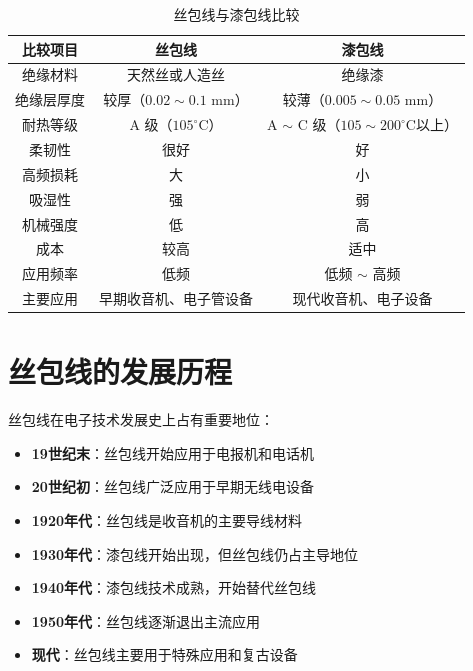 \documentclass[12pt,UTF8]{ctexbook}
\begin{document}
\begin{table}[H]
    \centering
    \begin{tabular}{|c|c|c|}
        \hline
        \textbf{比较项目} & \textbf{丝包线} & \textbf{漆包线} \\
        \hline
        绝缘材料 & 天然丝或人造丝 & 绝缘漆 \\
        \hline
        绝缘层厚度 & 较厚（$0.02 \sim 0.1$ mm） & 较薄（$0.005 \sim 0.05$ mm） \\
        \hline
        耐热等级 & A 级（$105^\circ$C） & A $\sim$ C 级（$105 \sim 200^\circ$C以上） \\
        \hline
        柔韧性 & 很好 & 好 \\
        \hline
        高频损耗 & 大 & 小 \\
        \hline
        吸湿性 & 强 & 弱 \\
        \hline
        机械强度 & 低 & 高 \\
        \hline
        成本 & 较高 & 适中 \\
        \hline
        应用频率 & 低频 & 低频 $\sim$ 高频 \\
        \hline
        主要应用 & 早期收音机、电子管设备 & 现代收音机、电子设备 \\
        \hline
    \end{tabular}
    \caption{丝包线与漆包线比较}
    \label{tab:silk_vs_enamel}
\end{table}

\section{丝包线的发展历程}

丝包线在电子技术发展史上占有重要地位：

\begin{itemize}[leftmargin=2cm]
    \item \textbf{19世纪末}：丝包线开始应用于电报机和电话机
    \item \textbf{20世纪初}：丝包线广泛应用于早期无线电设备
    \item \textbf{1920年代}：丝包线是收音机的主要导线材料
    \item \textbf{1930年代}：漆包线开始出现，但丝包线仍占主导地位
    \item \textbf{1940年代}：漆包线技术成熟，开始替代丝包线
    \item \textbf{1950年代}：丝包线逐渐退出主流应用
    \item \textbf{现代}：丝包线主要用于特殊应用和复古设备
\end{itemize}
\end{document}
